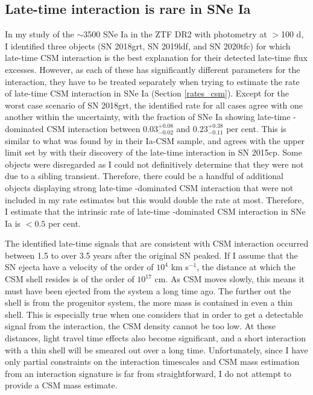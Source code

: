 \documentclass[a4paper,oneside,12pt, class=Latex/Classes/PhDthesisPSnPDF, crop=false]{standalone}
\begin{document}
\subsection{Late-time interaction is rare in SNe Ia}
\label{discuss_interaction}
In my study of the $\sim$3500 SNe Ia in the ZTF DR2 with photometry at $>$100 d, I identified three objects (SN 2018grt, SN 2019ldf, and SN 2020tfc) for which late-time CSM interaction is the best explanation for their detected late-time flux excesses. However, as each of these has significantly different parameters for the interaction, they have to be treated separately when trying to estimate the rate of late-time CSM interaction in SNe Ia (Section \ref{rates_csm}). Except for the worst case scenario of SN 2018grt, the identified rate for all cases agree with one another within the uncertainty, with the fraction of SNe Ia showing late-time \Halpha-dominated CSM interaction between $0.03^{+0.08}_{-0.02}$ and $0.23^{+0.38}_{-0.11}$ per cent. This is similar to what was found by \citet{Ia-CSM_BTS} in their Ia-CSM sample, and agrees with the upper limit set by \citet{2015cp} with their discovery of the late-time interaction in SN 2015cp. Some objects were disregarded as I could not definitively determine that they were not due to a sibling transient. Therefore, there could be a handful of additional objects displaying strong late-time \Halpha-dominated CSM interaction that were not included in my rate estimates but this would double the rate at most. Therefore, I estimate that the intrinsic rate of late-time \Halpha-dominated CSM interaction in SNe Ia is $<0.5$ per cent.

The identified late-time signals that are consistent with CSM interaction occurred between 1.5 to over 3.5 years after the original SN peaked. If I assume that the SN ejecta have a velocity of the order of $10^4$ km s$^{-1}$, the distance at which the CSM shell resides is of the order of $10^{17}$ cm. As CSM moves slowly, this means it must have been ejected from the system a long time ago. The further out the shell is from the progenitor system, the more mass is contained in even a thin shell. This is especially true when one considers that in order to get a detectable signal from the interaction, the CSM density cannot be too low. At these distances, light travel time effects also become significant, and a short interaction with a thin shell will be smeared out over a long time. Unfortunately, since I have only partial constraints on the interaction timescales and CSM mass estimation from an interaction signature is far from straightforward, I do not attempt to provide a CSM mass estimate.  
\end{document}

